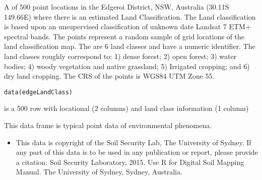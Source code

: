 \documentclass[a4paper]{book}
\begin{document}
%
\begin{Description}
A  of 500 point locations in the Edgeroi District, NSW, Australia (30.11S 149.66E) where there is an estimated Land Classification. The Land classification is based upon an unsupervised classification of unknown date Landsat 7 ETM+ spectral bands. The points represent a random sample of grid locations of the land classification map. The are 6 land classes and have a numeric identifier. The land classes roughly correspond to: 1) dense forest; 2) open forest; 3) water bodies; 4) woody vegetation and native grassland; 5) Irrigated cropping; and 6) dry land cropping. The CRS of the points is WGS84 UTM Zone 55.
\end{Description}
%
\begin{Usage}
\begin{verbatim}
data(edgeLandClass)
\end{verbatim}
\end{Usage}
%
\begin{Format}
 is a 500 row  with locational (2 columns) and land class information (1 column)
\end{Format}
%
\begin{Details}
This data frame is typical point data of environmental phenomena. 
\end{Details}
%
\begin{References}
\begin{itemize}

\item{} This data is copyright of the Soil Security Lab, The University of Sydney. If any part of this data is to be used in any publication or report, please provide a citation:
Soil Security Laboratory, 2015. Use R for Digital Soil Mapping Manual. The University of Sydney, Sydney, Australia.

\end{itemize}

\end{References}
%
\begin{Examples}
\end{Examples}
\end{document}
